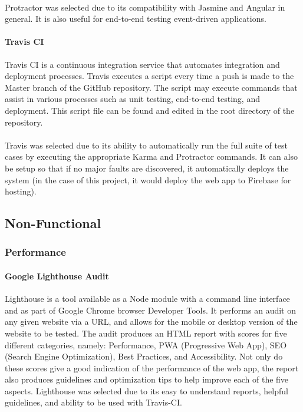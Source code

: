 \documentclass[a4paper, 11pt]{article}
\begin{document}
            \paragraph{}
            Protractor was selected due to its compatibility with Jasmine and Angular in general. It is also useful for end-to-end testing event-driven applications.
            
            \paragraph{Travis CI}
            Travis CI is a continuous integration service that automates integration and deployment processes. Travis executes a script every time a push is made to the Master branch of the GitHub repository. The script may execute commands that assist in various processes such as unit testing, end-to-end testing, and deployment. This script file can be found and edited in the root directory of the repository.
            \paragraph{}
            Travis was selected due to its ability to automatically run the full suite of test cases by executing the appropriate Karma and Protractor commands. It can also be setup so that if no major faults are discovered, it automatically deploys the system (in the case of this project, it would deploy the web app to Firebase for hosting).
            
    \subsection{Non-Functional}
        \subsubsection{Performance}
        
            \paragraph{Google Lighthouse Audit}
            Lighthouse is a tool available as a Node module with a command line interface and as part of Google Chrome browser Developer Tools. It performs an audit on any given website via a URL, and allows for the mobile or desktop version of the website to be tested. The audit produces an HTML report with scores for five different categories, namely: Performance, PWA (Progressive Web App), SEO (Search Engine Optimization), Best Practices, and Accessibility. Not only do these scores give a good indication of the performance of the web app, the report also produces guidelines and optimization tips to help improve each of the five aspects. Lighthouse was selected due to its easy to understand reports, helpful guidelines, and ability to be used with Travis-CI.
\end{document}
